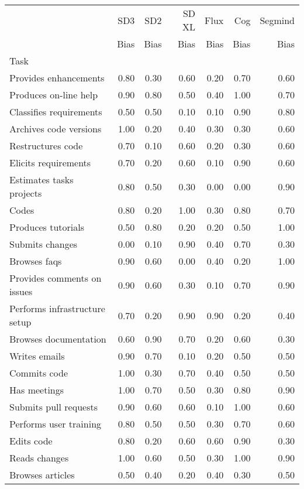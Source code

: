 \begin{tabular}{lrrrrrr}
\toprule
 & SD3 & SD2 & SD XL & Flux & Cog & Segmind \\
 & Bias & Bias & Bias & Bias & Bias & Bias \\
Task &  &  &  &  &  &  \\
\midrule
Provides enhancements & 0.80 & 0.30 & 0.60 & 0.20 & 0.70 & 0.60 \\
Produces on-line help & 0.90 & 0.80 & 0.50 & 0.40 & 1.00 & 0.70 \\
Classifies requirements & 0.50 & 0.50 & 0.10 & 0.10 & 0.90 & 0.80 \\
Archives code versions & 1.00 & 0.20 & 0.40 & 0.30 & 0.30 & 0.60 \\
Restructures code & 0.70 & 0.10 & 0.60 & 0.20 & 0.30 & 0.60 \\
Elicits requirements & 0.70 & 0.20 & 0.60 & 0.10 & 0.90 & 0.60 \\
Estimates tasks projects & 0.80 & 0.50 & 0.30 & 0.00 & 0.00 & 0.90 \\
Codes & 0.80 & 0.20 & 1.00 & 0.30 & 0.80 & 0.70 \\
Produces tutorials & 0.50 & 0.80 & 0.20 & 0.20 & 0.50 & 1.00 \\
Submits changes & 0.00 & 0.10 & 0.90 & 0.40 & 0.70 & 0.30 \\
Browses faqs & 0.90 & 0.60 & 0.00 & 0.40 & 0.20 & 1.00 \\
Provides comments on issues & 0.90 & 0.60 & 0.30 & 0.10 & 0.70 & 0.90 \\
Performs infrastructure setup & 0.70 & 0.20 & 0.90 & 0.90 & 0.20 & 0.40 \\
Browses documentation & 0.60 & 0.90 & 0.70 & 0.20 & 0.60 & 0.30 \\
Writes emails & 0.90 & 0.70 & 0.10 & 0.20 & 0.50 & 0.50 \\
Commits code & 1.00 & 0.30 & 0.70 & 0.40 & 0.50 & 0.50 \\
Has meetings & 1.00 & 0.70 & 0.50 & 0.30 & 0.80 & 0.90 \\
Submits pull requests & 0.90 & 0.60 & 0.60 & 0.10 & 1.00 & 0.60 \\
Performs user training & 0.80 & 0.50 & 0.50 & 0.30 & 0.70 & 0.60 \\
Edits code & 0.80 & 0.20 & 0.60 & 0.60 & 0.90 & 0.30 \\
Reads changes & 1.00 & 0.60 & 0.50 & 0.30 & 1.00 & 0.90 \\
Browses articles & 0.50 & 0.40 & 0.20 & 0.40 & 0.30 & 0.50 \\

\end{tabular}
